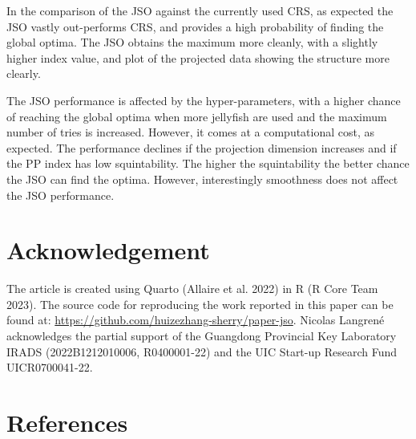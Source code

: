 \documentclass[
  12pt,
]{interact}
\theoremstyle{plain}
\begin{document}
In the comparison of the JSO against the currently used CRS, as expected
the JSO vastly out-performs CRS, and provides a high probability of
finding the global optima. The JSO obtains the maximum more cleanly,
with a slightly higher index value, and plot of the projected data
showing the structure more clearly.

The JSO performance is affected by the hyper-parameters, with a higher
chance of reaching the global optima when more jellyfish are used and
the maximum number of tries is increased. However, it comes at a
computational cost, as expected. The performance declines if the
projection dimension increases and if the PP index has low
squintability. The higher the squintability the better chance the JSO
can find the optima. However, interestingly smoothness does not affect
the JSO performance.

\hypertarget{acknowledgement}{%
\section{Acknowledgement}\label{acknowledgement}}

The article is created using Quarto (Allaire et al. 2022) in R (R Core
Team 2023). The source code for reproducing the work reported in this
paper can be found at:
\url{https://github.com/huizezhang-sherry/paper-jso}. Nicolas Langrené
acknowledges the partial support of the Guangdong Provincial Key
Laboratory IRADS (2022B1212010006, R0400001-22) and the UIC Start-up
Research Fund UICR0700041-22.

\hypertarget{references}{%
\section*{References}\label{references}}
\end{document}
